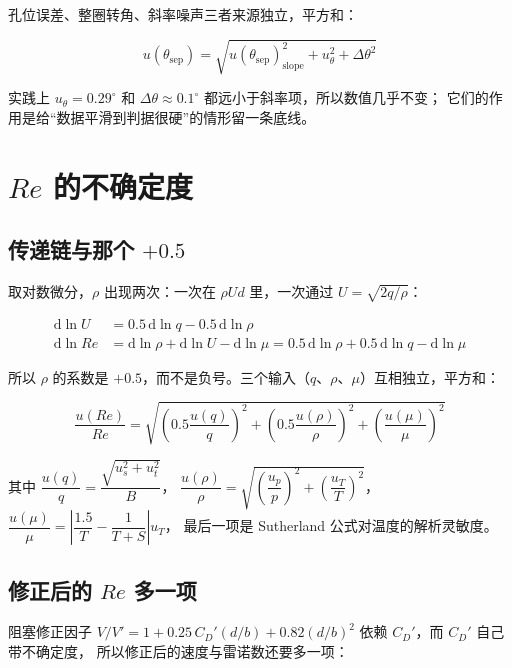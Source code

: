 \documentclass[11pt,a4paper]{ctexart}
\newcommand{\CD}{\ensuremath{C_D}}
\newcommand{\ReD}{\ensuremath{\mathit{Re}}}
\begin{document}
孔位误差、整圈转角、斜率噪声三者来源独立，平方和：

\begin{equation}
u(\theta_{\text{sep}}) = \sqrt{u(\theta_{\text{sep}})^2_{\text{slope}} + u_\theta^2 + \Delta\theta^2}
\end{equation}

实践上 $u_\theta = 0.29^\circ$ 和 $\Delta\theta \approx 0.1^\circ$ 都远小于斜率项，所以数值几乎不变；
它们的作用是给“数据平滑到判据很硬”的情形留一条底线。

\section{\ReD{} 的不确定度}
\label{sec:re}

\subsection{传递链与那个 $+0.5$}

取对数微分，$\rho$ 出现两次：一次在 $\rho U d$ 里，一次通过 $U = \sqrt{2q/\rho}$：

\begin{align}
\mathrm{d}\ln U &= 0.5\,\mathrm{d}\ln q - 0.5\,\mathrm{d}\ln\rho \\
\mathrm{d}\ln \ReD &= \mathrm{d}\ln\rho + \mathrm{d}\ln U - \mathrm{d}\ln\mu
= 0.5\,\mathrm{d}\ln\rho + 0.5\,\mathrm{d}\ln q - \mathrm{d}\ln\mu
\end{align}

所以 $\rho$ 的系数是 $+0.5$，而不是负号。三个输入（$q$、$\rho$、$\mu$）互相独立，平方和：

\begin{equation}
\frac{u(\ReD)}{\ReD} = \sqrt{\left(0.5\frac{u(q)}{q}\right)^2
+ \left(0.5\frac{u(\rho)}{\rho}\right)^2 + \left(\frac{u(\mu)}{\mu}\right)^2}
\end{equation}

其中
$\dfrac{u(q)}{q} = \dfrac{\sqrt{u_s^2 + u_t^2}}{B}$，
$\dfrac{u(\rho)}{\rho} = \sqrt{\left(\dfrac{u_p}{p}\right)^2 + \left(\dfrac{u_T}{T}\right)^2}$，
$\dfrac{u(\mu)}{\mu} = \left|\dfrac{1.5}{T} - \dfrac{1}{T+S}\right|u_T$，
最后一项是 Sutherland 公式对温度的解析灵敏度。

\subsection{修正后的 \ReD{} 多一项}

阻塞修正因子 $V/V' = 1 + 0.25\,\CD'(d/b) + 0.82(d/b)^2$ 依赖 $\CD'$，而 $\CD'$ 自己带不确定度，
所以修正后的速度与雷诺数还要多一项：
\end{document}
